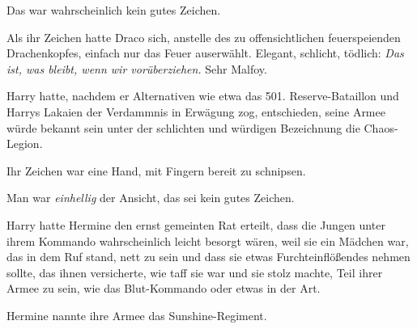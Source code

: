 Das war wahrscheinlich kein gutes Zeichen.

Als ihr Zeichen hatte Draco sich, anstelle des zu offensichtlichen feuerspeienden Drachenkopfes, einfach nur das Feuer auserwählt. Elegant, schlicht, tödlich: \emph{Das ist, was bleibt, wenn wir vorüberziehen.} Sehr Malfoy.

Harry hatte, nachdem er Alternativen wie etwa das 501. Reserve-Bataillon und Harrys Lakaien der Verdammnis in Erwägung zog, entschieden, seine Armee würde bekannt sein unter der schlichten und würdigen Bezeichnung die Chaos-Legion.%

Ihr Zeichen war eine Hand, mit Fingern bereit zu schnipsen.

Man war \emph{einhellig} der Ansicht, das sei kein gutes Zeichen.

Harry hatte Hermine den ernst gemeinten Rat erteilt, dass die Jungen unter ihrem Kommando wahrscheinlich leicht besorgt wären, weil sie ein Mädchen war, das in dem Ruf stand, nett zu sein und dass sie etwas Furchteinflößendes nehmen sollte, das ihnen versicherte, wie taff sie war und sie stolz machte, Teil ihrer Armee zu sein, wie das Blut-Kommando oder etwas in der Art.

Hermine nannte ihre Armee das Sunshine-Regiment.

